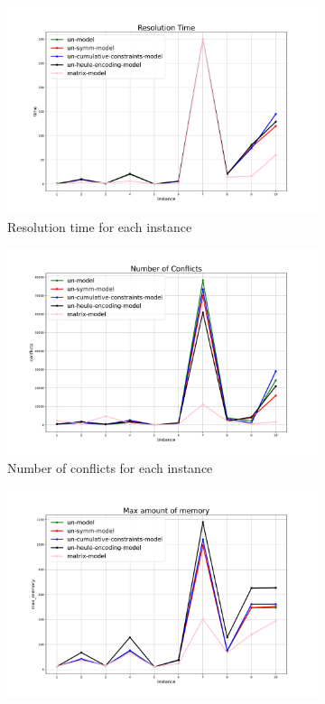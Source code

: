 \begin{figure}[H]
    \centering
    \begin{subfigure}{0.49\linewidth}
        \centering
        \includegraphics[width=\linewidth]{sat_images/time.pdf}
        \caption{Resolution time for each instance}
    \end{subfigure}
    \hfill
    \centering
    \begin{subfigure}{0.49\linewidth}
        \centering
        \includegraphics[width=\linewidth]{sat_images/conflicts.pdf}
        \caption{Number of conflicts for each instance}
    \end{subfigure}
    \hfill
    \centering
    \begin{subfigure}{0.49\linewidth}
        \centering
        \includegraphics[width=\linewidth]{sat_images/max_memory.pdf}

\end{subfigure}
\end{figure}
